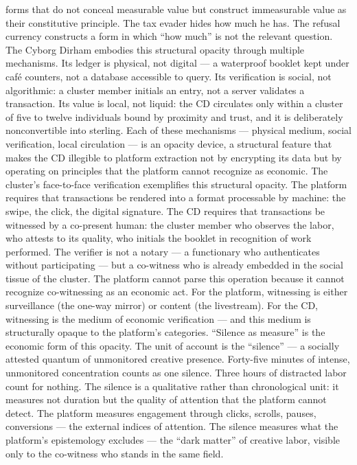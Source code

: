 forms that do not conceal measurable value but construct immeasurable value as their constitutive principle. The tax evader hides how much he has. The refusal currency constructs a form in which “how much” is not the relevant question. The Cyborg Dirham embodies this structural opacity through multiple mechanisms. Its ledger is physical, not digital — a waterproof booklet kept under café counters, not a database accessible to query. Its verification is social, not algorithmic: a cluster member initials an entry, not a server validates a transaction. Its value is local, not liquid: the CD circulates only within a cluster of five to twelve individuals bound by proximity and trust, and it is deliberately nonconvertible into sterling. Each of these mechanisms — physical medium, social verification, local circulation — is an opacity device, a structural feature that makes the CD illegible to platform extraction not by encrypting its data but by operating on principles that the platform cannot recognize as economic. The cluster’s face-to-face verification exemplifies this structural opacity. The platform requires that transactions be rendered into a format processable by machine: the swipe, the click, the digital signature. The CD requires that transactions be witnessed by a co-present human: the cluster member who observes the labor, who attests to its quality, who initials the booklet in recognition of work performed. The verifier is not a notary — a functionary who authenticates without participating — but a co-witness who is already embedded in the social tissue of the cluster. The platform cannot parse this operation because it cannot recognize co-witnessing as an economic act. For the platform, witnessing is either surveillance (the one-way mirror) or content (the livestream). For the CD, witnessing is the medium of economic verification — and this medium is structurally opaque to the platform’s categories. “Silence as measure” is the economic form of this opacity. The unit of account is the “silence” — a socially attested quantum of unmonitored creative presence. Forty-five minutes of intense, unmonitored concentration counts as one silence. Three hours of distracted labor count for nothing. The silence is a qualitative rather than chronological unit: it measures not duration but the quality of attention that the platform cannot detect. The platform measures engagement through clicks, scrolls, pauses, conversions — the external indices of attention. The silence measures what the platform’s epistemology excludes — the “dark matter” of creative labor, visible only to the co-witness who stands in the same field.

